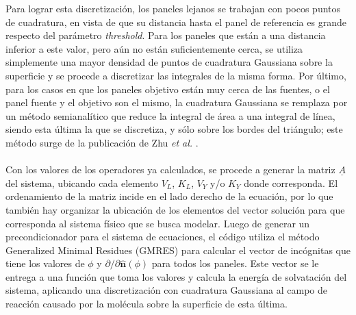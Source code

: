 \documentclass[12pt, notitlepage]{article}
\numberwithin{equation}{section}
\begin{document}
Para lograr esta discretización, los paneles lejanos se trabajan con pocos puntos de cuadratura, en vista de que su distancia hasta el panel de referencia es grande respecto del parámetro \textit{threshold}. Para los paneles que están a una distancia inferior a este valor, pero aún no están suficientemente cerca, se utiliza simplemente una mayor densidad de puntos de cuadratura Gaussiana sobre la superficie y se procede a discretizar las integrales de la misma forma. Por último, para los casos en que los paneles objetivo están muy cerca de las fuentes, o el panel fuente y el objetivo son el mismo, la cuadratura Gaussiana se remplaza por un método semianalítico que reduce la integral de área a una integral de línea, siendo esta última la que se discretiza, y sólo sobre los bordes del triángulo; este método surge de la publicación de Zhu \textit{et al.} \cite{Zhu}.\\\\
Con los valores de los operadores ya calculados, se procede a generar la matriz $\underline{A}$ del sistema, ubicando cada elemento $V_L$, $K_L$, $V_Y$ y/o $K_Y$ donde corresponda. El ordenamiento de la matriz incide en el lado derecho de la ecuación, por lo que también hay organizar la ubicación de los elementos del vector solución para que corresponda al sistema físico que se busca modelar. Luego de generar un precondicionador para el sistema de ecuaciones, el código utiliza el método Generalized Minimal Residues (GMRES) para calcular el vector de incógnitas que tiene los valores de $\phi$ y $\partial/\partial\hat{\mathbf{n}}(\phi)$ para todos los paneles. Este vector se le entrega a una función que toma los valores y calcula la energía de solvatación del sistema, aplicando una discretización con cuadratura Gaussiana al campo de reacción causado por la molécula sobre la superficie de esta última. 



\end{document}
